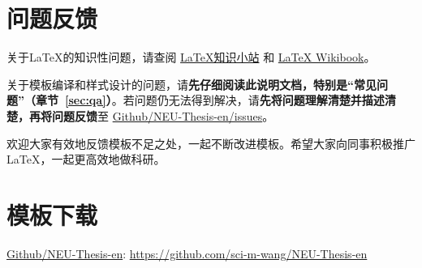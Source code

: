 \section{问题反馈}

关于\LaTeX{}的知识性问题，请查阅 
\href{https://github.com/mohuangrui/ucasthesis/wiki}{\LaTeX{}知识小站} 和 
\href{https://en.wikibooks.org/wiki/LaTeX}{\LaTeX{} Wikibook}。

关于模板编译和样式设计的问题，请\textbf{先仔细阅读此说明文档，特别是“常见问题”（章节~\ref{sec:qa}）}。若问题仍无法得到解决，请\textbf{先将问题理解清楚并描述清楚，再将问题反馈}至 \href{https://github.com/sci-m-wang/NEU-Thesis-en/issues}{Github/NEU-Thesis-en/issues}。

欢迎大家有效地反馈模板不足之处，一起不断改进模板。希望大家向同事积极推广\LaTeX{}，一起更高效地做科研。

\section{模板下载}

\begin{center}
    \href{https://github.com/sci-m-wang/NEU-Thesis-en}{Github/NEU-Thesis-en}: \url{https://github.com/sci-m-wang/NEU-Thesis-en}
\end{center}

